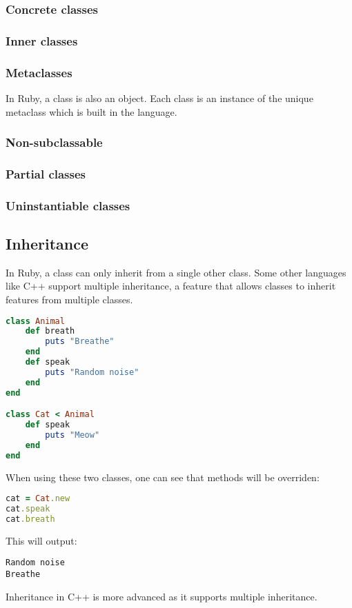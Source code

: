 \documentclass[10pt,a4paper,twocolumn]{article}
\begin{document}
\subsubsection{Concrete classes}

\subsubsection{Inner classes}

\subsubsection{Metaclasses}
In Ruby, a class is also an object. Each class is an instance of the unique metaclass which is built in the language.

\subsubsection{Non-subclassable}

\subsubsection{Partial classes}

\subsubsection{Uninstantiable classes}

\subsection{Inheritance}
In Ruby, a class can only inherit from a single other class. Some other languages like C++ support multiple inheritance, a feature that allows classes to inherit features from multiple classes.
\begin{lstlisting}[language=Ruby]
class Animal
	def breath
		puts "Breathe"
	end
	def speak
		puts "Random noise"
	end
end

class Cat < Animal
	def speak
		puts "Meow"
	end
end
\end{lstlisting}
When using these two classes, one can see that methods will be overriden:
\begin{lstlisting}[language=Ruby]
cat = Cat.new
cat.speak
cat.breath
\end{lstlisting}
This will output:
\begin{lstlisting}
Random noise
Breathe
\end{lstlisting}
Inheritance in C++ is more advanced as it supports multiple inheritance.
\end{document}

